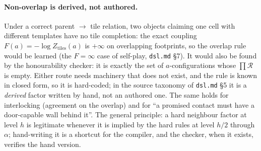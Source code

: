 \documentclass[11pt]{article}
\newcommand{\1}{\mathds{1}}
\newcommand{\refine}{\mathcal{R}}
\begin{document}
\paragraph{Non-overlap is derived, not authored.} Under a correct parent
$\to$ tile relation, two objects claiming one cell with different templates
have no tile completion: the exact coupling $F(a) = -\log Z_{\text{tiles}}(a)$ is
$+\infty$ on overlapping footprints, so the overlap rule would be learned (the
$F = \infty$ case of self-play, \texttt{dsl.md} \S7). It would also be found by
the honourability checker: it is exactly the set of $a$-configurations whose
$\prod \refine$ is empty. Either route needs machinery that does not exist, and
the rule is known in closed form, so it is hard-coded; in the source taxonomy of
\texttt{dsl.md} \S5 it is a \emph{derived} factor written by hand, not an
authored one. The same holds for interlocking (agreement on the overlap) and for
``a promised contact must have a door-capable wall behind it''. The general
principle: a hard neighbour factor at level $h$ is legitimate whenever it is
implied by the hard rules at level $h/2$ through $\alpha$; hand-writing it is a
shortcut for the compiler, and the checker, when it exists, verifies the hand
version.
\end{document}
